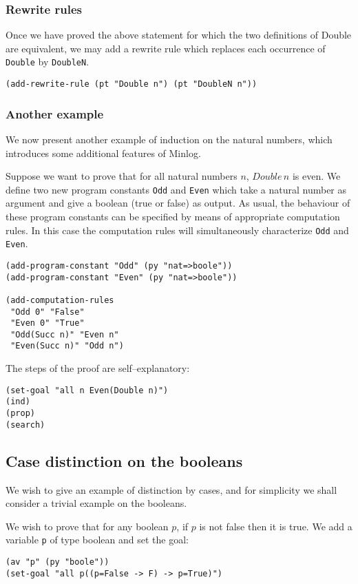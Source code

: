 \documentclass[12pt]{amsart}
\newcommand{\mi}{Minlog}
\begin{document}
\subsubsection{Rewrite rules}
Once we have proved the above statement for which the two definitions
of Double are equivalent, we may add a rewrite rule which replaces
each occurrence of \texttt{Double} by \texttt{DoubleN}.
\begin{verbatim}
(add-rewrite-rule (pt "Double n") (pt "DoubleN n"))
\end{verbatim}


\subsubsection{Another example}
\label{EvenOdd}
We now present another example of induction on the natural numbers,
which introduces some additional features of \mi.

Suppose we want to prove that for all natural numbers $n$, $Double\,
n$ is even.  We define two new program constants \texttt{Odd} and
\texttt{Even} which take a natural number as argument and give a
boolean (true or false) as output.  As usual, the behaviour of these
program constants can be specified by means of appropriate computation
rules. In this case the computation rules will simultaneously
characterize \texttt{Odd} and \texttt{Even}.
\begin{verbatim}
(add-program-constant "Odd" (py "nat=>boole"))
(add-program-constant "Even" (py "nat=>boole"))

(add-computation-rules
 "Odd 0" "False"
 "Even 0" "True"
 "Odd(Succ n)" "Even n"
 "Even(Succ n)" "Odd n")
\end{verbatim}

The steps of the proof are self--explanatory:
\begin{verbatim}
(set-goal "all n Even(Double n)")
(ind)
(prop)
(search)
\end{verbatim}


\subsection{Case distinction on the booleans}
We wish to give an example of distinction by cases, and for simplicity
we shall consider a trivial example on the booleans.

We wish to prove that for any boolean $p$, if $p$ is not false then it
is true.  We add a variable \texttt{p} of type boolean and set the
goal:
\begin{verbatim}
(av "p" (py "boole"))
(set-goal "all p((p=False -> F) -> p=True)")
\end{verbatim}
\end{document}
